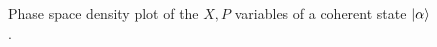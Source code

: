 

\begin{figure}[htb]
	\centering
	
	\caption{Phase space density plot of the $X,P$ variables of a coherent state $\ket{\alpha}$.}
\end{figure}